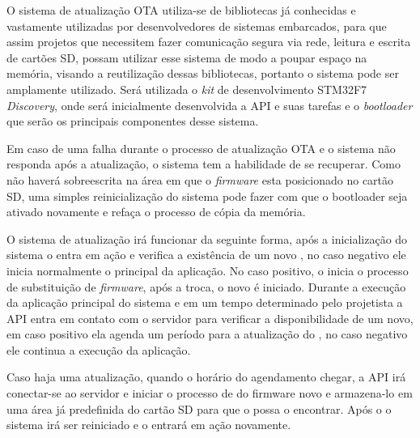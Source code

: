 O sistema de atualização OTA utiliza-se de bibliotecas já conhecidas e vastamente utilizadas por desenvolvedores de sistemas embarcados, para que assim projetos que necessitem fazer comunicação segura via rede, leitura e escrita de cartões SD, possam utilizar esse sistema de modo a poupar espaço na memória, visando a reutilização dessas bibliotecas, portanto o sistema pode ser amplamente utilizado. Será utilizada o \textit{kit} de desenvolvimento STM32F7 \textit{Discovery}, onde será inicialmente desenvolvida a API e suas tarefas e o \textit{bootloader} que serão os principais componentes desse sistema.

Em caso de uma falha durante o processo de atualização OTA e o sistema não responda após a atualização, o sistema tem a habilidade de se recuperar. Como não haverá sobreescrita na área em que o \textit{firmware} esta posicionado no cartão SD, uma simples reinicialização do sistema pode fazer com que o bootloader seja ativado novamente e refaça o processo de cópia da memória.

O sistema de atualização irá funcionar da seguinte forma, após a inicialização do sistema o \bootloader entra em ação e verifica a existência de um novo \firmware, no caso negativo ele inicia normalmente o \software principal da aplicação. No caso positivo, o \bootloader inicia o processo de substituição de \textit{firmware}, após a troca, o novo \software é iniciado. Durante a execução da aplicação principal do sistema e em um tempo determinado pelo projetista a API entra em contato com o servidor para verificar a disponibilidade de um \software novo, em caso positivo ela agenda um período para a atualização do \firmware, no caso negativo ele continua a execução da aplicação. 

Caso haja uma atualização, quando o horário do agendamento chegar, a API irá conectar-se ao servidor e iniciar o processo de \download do firmware novo e armazena-lo em uma área já predefinida do cartão SD para que o \bootloader possa o encontrar. Após o \download o sistema irá ser reiniciado e o \bootloader entrará em ação novamente. 





